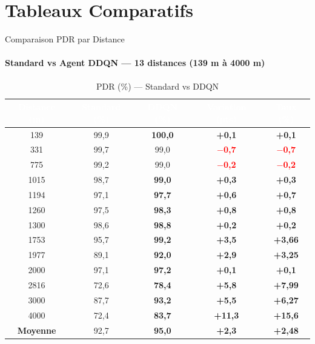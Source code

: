 \documentclass[aspectratio=169, 11pt]{beamer}
\newcommand{\cellgreen}[1]{\cellcolor{green!10}\textcolor{green!50!black}{\textbf{#1}}}
\newcommand{\cellred}[1]{\cellcolor{red!10}\textcolor{red}{\textbf{#1}}}
\begin{document}
	\section{Tableaux Comparatifs}
	
	\begin{frame}{Comparaison PDR par Distance}
		\framesubtitle{Standard vs Agent DDQN — 13 distances (139 m à 4000 m)}
		
		\vspace{-0.3em}
		\begin{table}
			\centering
			\renewcommand{\arraystretch}{1.1}
			\fontsize{6.5}{9}\selectfont
			\begin{tabular}{|c|c|c|c|c|}
				\hline
				\rowcolor{blue!50}
				\textcolor{white}{\textbf{Distance (m)}} &
				\textcolor{white}{\textbf{Standard (\%)}} &
				\textcolor{white}{\textbf{DDQN (\%)}} &
				\textcolor{white}{\textbf{Variation (pts)}} &
				\textcolor{white}{\textbf{Taux (\%)}} \\
				\hline
				139  & 99,9 & \textbf{100,0} & \cellgreen{+0,1} & \cellgreen{+0,1} \\
				\hline
				331  & 99,7 & 99,0  & \cellred{$-$0,7} & \cellred{$-$0,7} \\
				\hline
				775  & 99,2 & 99,0  & \cellred{$-$0,2} & \cellred{$-$0,2} \\
				\hline
				1015 & 98,7 & \textbf{99,0} & \cellgreen{+0,3} & \cellgreen{+0,3} \\
				\hline
				1194 & 97,1 & \textbf{97,7} & \cellgreen{+0,6} & \cellgreen{+0,7} \\
				\hline
				1260 & 97,5 & \textbf{98,3} & \cellgreen{+0,8} & \cellgreen{+0,8} \\
				\hline
				1300 & 98,6 & \textbf{98,8} & \cellgreen{+0,2} & \cellgreen{+0,2} \\
				\hline
				1753 & 95,7 & \textbf{99,2} & \cellgreen{+3,5} & \cellgreen{+3,66} \\
				\hline
				1977 & 89,1 & \textbf{92,0} & \cellgreen{+2,9} & \cellgreen{+3,25} \\
				\hline
				2000 & 97,1 & \textbf{97,2} & \cellgreen{+0,1} & \cellgreen{+0,1} \\
				\hline
				2816 & 72,6 & \textbf{78,4} & \cellgreen{+5,8} & \cellgreen{+7,99} \\
				\hline
				3000 & 87,7 & \textbf{93,2} & \cellgreen{+5,5} & \cellgreen{+6,27} \\
				\hline
				4000 & 72,4 & \textbf{83,7} & \cellgreen{+11,3} & \cellgreen{+15,6} \\
				\hline\hline
				\rowcolor{cyan!30}
				\textbf{Moyenne} & 92,7 & \textbf{95,0} & \cellgreen{+2,3} & \cellgreen{+2,48} \\
				\hline
			\end{tabular}
			\caption{PDR (\%) — Standard vs DDQN}
			\label{tab:comparaison_pdr}
		\end{table}
		

\end{frame}
\end{document}
